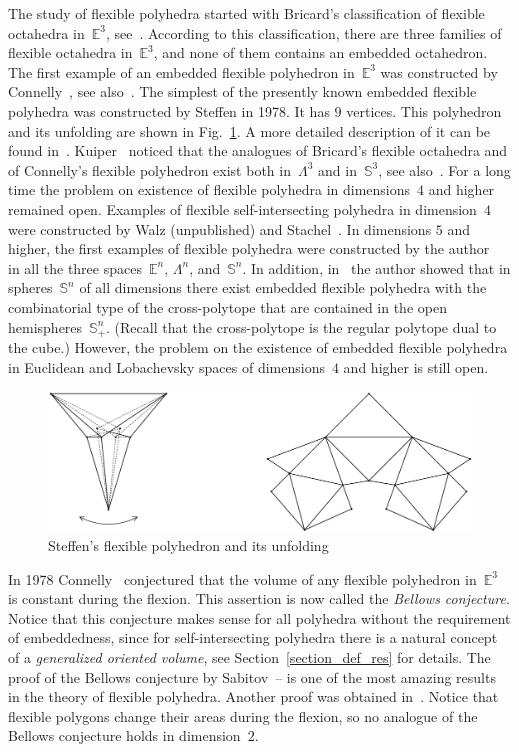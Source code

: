 \documentclass[reqno,tbtags,12pt]{amsart}
\numberwithin{equation}{section}
\newcommand{\E}{\mathbb{E}}
\newcommand{\bS}{\mathbb{S}}
\theoremstyle{definition}
\begin{document}
The study of flexible polyhedra started with Bricard's classification of flexible octahedra in~$\E^3$, see~\cite{Bri97}. According to this classification, there are three families of flexible octahedra in~$\E^3$, and none of them contains an embedded octahedron. The first example of an embedded flexible polyhedron in~$\E^3$ was constructed by Connelly~\cite{Con77}, see also~\cite{Kui78}. 
The simplest of the presently known  embedded flexible polyhedra was constructed by Steffen in 1978. It has $9$ vertices. This polyhedron and its unfolding are shown in Fig.~\ref{fig_steffen}. A more detailed description of it can be found in~\cite{Con78a}. Kuiper~\cite[Sect.~2.7]{Kui78} noticed that the analogues of Bricard's flexible octahedra and of Connelly's flexible polyhedron exist both in~$\Lambda^3$ and in~$\bS^3$, see also~\cite{Sta06}. For a long time the problem on existence of flexible polyhedra in dimensions~$4$ and higher remained open. Examples of flexible self-intersecting polyhedra in dimension~$4$ were constructed by Walz (unpublished) and Stachel~\cite{Sta00}. In dimensions $5$ and higher, the first examples of flexible polyhedra were constructed by the author~\cite{Gai13} in all the three spaces~$\E^n$, $\Lambda^n$, and~$\bS^n$. In addition, in~\cite{Gai15} the author showed that in spheres~$\bS^n$ of all dimensions there exist embedded flexible polyhedra with the combinatorial type of the cross-polytope that are contained in the open hemispheres~$\bS^n_+$. (Recall that the cross-polytope is the  regular polytope dual to the cube.) However, the problem on the existence of embedded flexible polyhedra in Euclidean and Lobachevsky spaces of dimensions~$4$ and higher is still open.

\begin{figure}
\begin{center}
\includegraphics[scale=0.25]{figure1.eps}
\end{center}
\caption{Steffen's flexible polyhedron and its unfolding}\label{fig_steffen}
\end{figure}


In 1978 Connelly~\cite{Con78} conjectured that the volume of any flexible polyhedron in~$\E^3$ is constant during the flexion. This assertion is now called the \textit{Bellows conjecture\/}. Notice that this conjecture makes sense for all polyhedra without the requirement of embeddedness, since for self-intersecting polyhedra there is a natural concept of a \textit{generalized oriented volume\/}, see Section~\ref{section_def_res} for details. The proof of the Bellows conjecture by Sabitov~\cite{Sab96}--\cite{Sab98b} is one of the most amazing results in the theory of flexible polyhedra. Another proof was obtained in~\cite{CSW97}. Notice that flexible polygons change their areas during the flexion, so no analogue of the Bellows conjecture holds in dimension~$2$.
\end{document}

